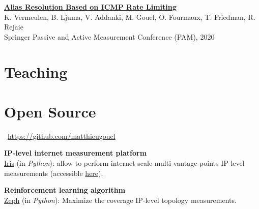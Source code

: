 \documentclass[11pt,a4paper,sans]{moderncv} %
\begin{document}
\vspace{0.25cm}
\href{https://arxiv.org/pdf/2002.00252.pdf}{\textbf{Alias Resolution Based on ICMP Rate Limiting}} \\
K. Vermeulen, B. Ljuma, V. Addanki, M. Gouel, O. Fourmaux, T. Friedman, R. Rejaie\\
Springer Passive and Active Measurement Conference (PAM), 2020


\section{Teaching}




\section{Open Source}

\faGithub~\href{https://github.com/matthieugouel}{https://github.com/matthieugouel}

\vspace{+0.25cm}
\textbf{IP-level internet measurement platform}\\
\href{https://github.com/dioptra-io/iris}{Iris} (in \emph{Python}): allow to perform internet-scale multi vantage-points IP-level measurements (accessible \href{https://iris.dioptra.io/#/}{here}).

\vspace{+0.25cm}
\textbf{Reinforcement learning algorithm}\\
\href{https://github.com/dioptra-io/zeph}{Zeph} (in \emph{Python}): Maximize the coverage IP-level topology measurements.
\end{document}
